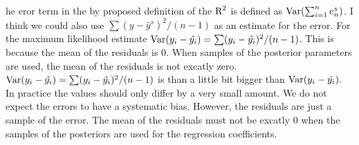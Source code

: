 \documentclass[11pt,a4paper,twoside]{book}\usepackage[]{graphicx}\usepackage[]{color}
\begin{document}
he eror term in the by \cite{Gelman2017} proposed definition of the $\text{R}^2$ is defined as $\operatorname{Var}(\sum_{i=1}^{n}e^s_{n})$. I think we could also use $ \sum(y - \hat{y}^s)^2/(n-1) $ as an estimate for the error. For the maximum likelihood estimate $\operatorname{Var}(y_{i} - \hat{y_{i}}) = \sum (y_{i} - \hat{y_{i}})^2/ (n-1) $. This is because the mean of the residuals is 0. When  samples of the posterior parameters are used, the mean of the residuals is not excatly zero. $\operatorname{Var}(y_{i} - \hat{y_{i}}) = \sum (y_{i} - \hat{y_{i}})^2/ (n-1) $ is than a little bit bigger than $\operatorname{Var}(y_{i} - \hat{y_{i}}). $ In practice the values should only differ by a very small amount. We do not expect the errors to have a systematic bias. However, the residuals are just a sample of the error. The mean of the residuals must not be excatly 0 when the samples of the posteriors are used for the regression coefficients.   




\cleardoublepage

\appendix
\end{document}
